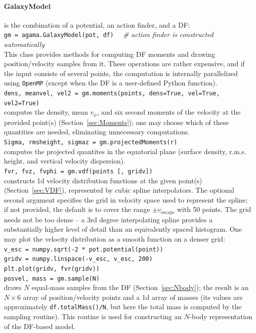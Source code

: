 \documentclass[12pt]{article}
\begin{document}
\paragraph{GalaxyModel} is the combination of a potential, an action finder, and a DF:\\
\texttt{gm = agama.GalaxyModel(pot, df)}
\textit{\color{Sepia}\ \ \# action finder is constructed automatically} \\[2mm]
This class provides methods for computing DF moments and drawing position/velocity samples from it. These operations are rather expensive, and if the input consists of several points, the computation is internally parallelized using \texttt{OpenMP} (except when the DF is a user-defined Python function).\\[2mm]
\texttt{dens, meanvel, vel2 = gm.moments(points, dens=True, vel=True, vel2=True)}\\
computes the density, mean $v_\phi$, and six second moments of the velocity at the provided point(s) (Section~\ref{sec:Moments}); one may choose which of these quantities are needed, eliminating unnecessary computations.\\[2mm]
\texttt{Sigma, rmsheight, sigmaz = gm.projectedMoments(r)}\\
computes the projected quantites in the equatorial plane (surface density, r.m.s. height, and vertical velocity dispersion).\\[2mm]
\texttt{fvr, fvz, fvphi = gm.vdf(points [, gridv])}\\
constructs 1d velocity distribution functions at the given point(s) (Section~\ref{sec:VDF}), represented by cubic spline interpolators. The optional second argument specifies the grid in velocity space used to represent the spline; if not provided, the default is to cover the range $\pm v_\mathrm{escape}$ with 50 points. The grid needs not be too dense -- a 3rd degree interpolating spline provides a substantially higher level of detail than an equivalently spaced histogram.
One may plot the velocity distribution as a smooth function on a denser grid:\\
\texttt{v_esc = numpy.sqrt(-2 * pot.potential(point))\\
gridv = numpy.linspace(-v_esc, v_esc, 200)\\
plt.plot(gridv, fvr(gridv))} \\[2mm]
\texttt{posvel, mass = gm.sample(N)}\\
draws $N$ equal-mass samples from the DF (Section~\ref{sec:Nbody}); the result is an $N\times6$ array of position/velocity points and a 1d array of masses (its values are approximately \texttt{df.totalMass()/N}, but here the total mass is computed by the sampling routine). This routine is used for constructing an $N$-body representation of the DF-based model.
\end{document}
